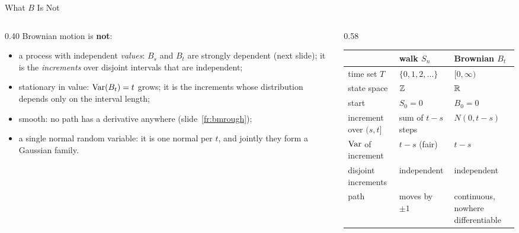 \begin{frame}{What $B$ Is Not}
  \label{fr:bmnot}
  \small
  \begin{columns}[T]
    \begin{column}{0.40\textwidth}
      Brownian motion is \textbf{not}:
      \begin{itemize}
        \item a process with independent \emph{values}: $B_s$ and $B_t$ are strongly dependent (next slide); it is the \emph{increments} over disjoint intervals that are independent;
        \item stationary in value: $\operatorname{Var}(B_t)=t$ grows; it is the increments whose distribution depends only on the interval length;
        \item smooth: no path has a derivative anywhere (slide~\ref{fr:bmrough});
        \item a single normal random variable: it is one normal per $t$, and jointly they form a Gaussian family.
      \end{itemize}
    \end{column}
    \begin{column}{0.58\textwidth}
      \footnotesize
      \renewcommand{\arraystretch}{1.3}
      \begin{tabular}{@{}ll>{\raggedright\arraybackslash}p{2.4cm}@{}}
        \toprule
        & walk $S_n$ & Brownian $B_t$ \\
        \midrule
        time set $T$ & $\{0,1,2,\dots\}$ & $[0,\infty)$ \\
        state space & $\mathbb{Z}$ & $\mathbb{R}$ \\
        start & $S_0=0$ & $B_0=0$ \\
        increment over $(s,t]$ & sum of $t-s$ steps & $N(0,t-s)$ \\
        $\operatorname{Var}$ of increment & $t-s$ (fair) & $t-s$ \\
        disjoint increments & independent & independent \\
        path & moves by $\pm1$ & continuous, nowhere differentiable \\
        \bottomrule
      \end{tabular}
    \end{column}
  \end{columns}
\end{frame}



